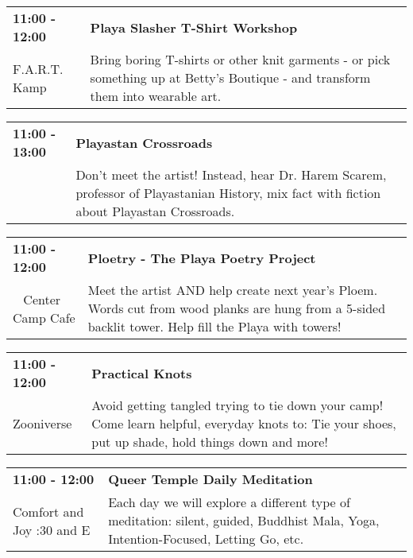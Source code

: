 \begin{tabular}{ p{1in} p{2.2in} }
    \textbf{11:00 - 12:00} & \textbf{Playa Slasher T-Shirt Workshop} \\
    F.A.R.T. Kamp \newline  & Bring boring T-shirts or other knit garments - or pick something up at Betty's Boutique - and transform them into wearable art. \\
    \hline 
\end{tabular}
    
\begin{tabular}{ p{1in} p{2.2in} }
    \textbf{11:00 - 13:00} & \textbf{Playastan Crossroads} \\
    ~ \newline  & Don't meet the artist! Instead, hear Dr. Harem Scarem, professor of Playastanian History, mix fact with fiction about Playastan Crossroads. \\
    \hline 
\end{tabular}
    
\begin{tabular}{ p{1in} p{2.2in} }
    \textbf{11:00 - 12:00} & \textbf{Ploetry - The Playa Poetry Project} \\
    ~ \newline Center Camp Cafe & Meet the artist AND help create next year's Ploem. Words cut from wood planks are hung from a 5-sided backlit tower. Help fill the Playa with towers! \\
    \hline 
\end{tabular}
    
\begin{tabular}{ p{1in} p{2.2in} }
    \textbf{11:00 - 12:00} & \textbf{Practical Knots} \\
    Zooniverse \newline  & Avoid getting tangled trying to tie down your camp! Come learn helpful, everyday knots to: Tie your shoes, put up shade, hold things down and more! \\
    \hline 
\end{tabular}
    
\begin{tabular}{ p{1in} p{2.2in} }
    \textbf{11:00 - 12:00} & \textbf{Queer Temple Daily Meditation} \\
    Comfort and Joy \newline 7:30 and E & Each day we will explore a different type of meditation: silent, guided, Buddhist Mala, Yoga, Intention-Focused, Letting Go, etc. \\
    \hline 
\end{tabular}
    
